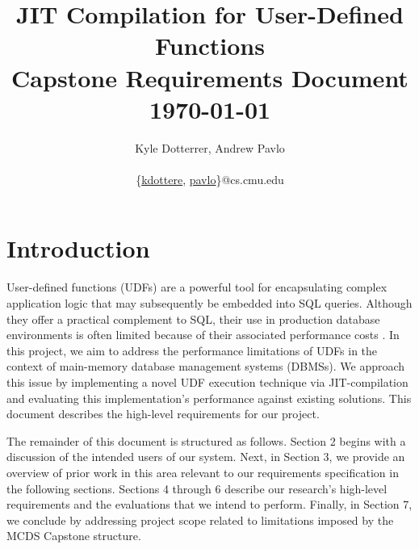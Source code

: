 \documentclass{vldb}
\newcommand{\paperTitle}{JIT Compilation for User-Defined Functions\\ 
    \large Capstone Requirements Document\\
    \today}
\begin{document}
\title{\paperTitle}

\author{
    \alignauthor Kyle Dotterrer, Andrew Pavlo\\
    \\
    \email 
        \{\href{mailto:kdottere@cs.cmu.edu}{kdottere},
        \href{mailto:pavlo@cs.cmu.edu}{pavlo}\}@cs.cmu.edu\\
}

\makeatletter
\def\@copyrightspace{\relax}
\makeatother

\maketitle


\section{Introduction}

User-defined functions (UDFs) are a powerful tool for encapsulating complex application logic that may subsequently be embedded into SQL queries. Although they offer a practical complement to SQL, their use in production database environments is often limited because of their associated performance costs \cite{froid, apfel}. In this project, we aim to address the performance limitations of UDFs in the context of main-memory database management systems (DBMSs). We approach this issue by implementing a novel UDF execution technique via JIT-compilation and evaluating this implementation's performance against existing solutions. This document describes the high-level requirements for our project. 

The remainder of this document is structured as follows. Section 2 begins with a discussion of the intended users of our system. Next, in Section 3, we provide an overview of prior work in this area relevant to our requirements specification in the following sections. Sections 4 through 6 describe our research's high-level requirements and the evaluations that we intend to perform. Finally, in Section 7, we conclude by addressing project scope related to limitations imposed by the MCDS Capstone structure.

\end{document}
